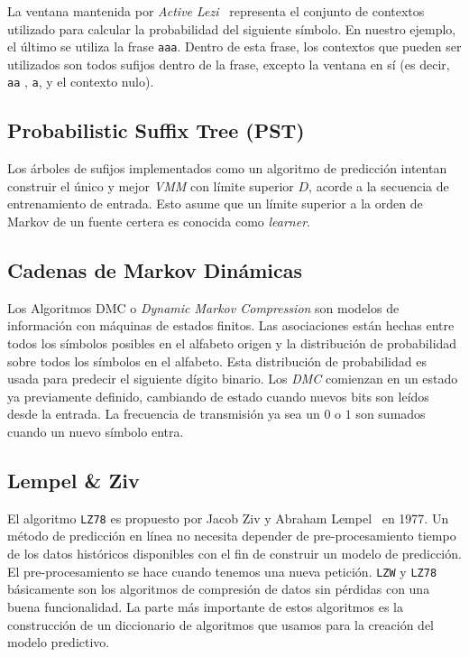 La ventana mantenida por \emph{Active Lezi}~\cite{Gopalratnam2007} representa el conjunto de contextos utilizado para calcular la probabilidad  del siguiente símbolo. En nuestro ejemplo, el último se utiliza la frase \texttt{aaa}. Dentro de esta frase, los contextos que pueden ser utilizados son todos sufijos dentro de la frase, excepto la ventana en sí (es decir, \texttt{aa} , \texttt{a}, y el contexto nulo).

	


 \subsection{Probabilistic Suffix Tree (PST)}
 
 Los árboles de sufijos implementados como un algoritmo de predicción intentan construir el único y mejor \emph{VMM} con límite superior $D$, acorde a la secuencia de entrenamiento de entrada. Esto asume que un límite superior a la orden de Markov de un fuente certera es conocida como \emph{learner}.
 
 
 
 \subsection{Cadenas de Markov Dinámicas}
 
 
 Los Algoritmos DMC o \emph{Dynamic Markov Compression} son modelos de información con máquinas de estados finitos. Las asociaciones están hechas entre todos los símbolos posibles en el alfabeto origen y la distribución de probabilidad sobre todos los símbolos en el alfabeto. 
 Esta distribución de probabilidad es usada para predecir el siguiente dígito binario. 
 Los \emph{DMC} comienzan en un estado ya previamente definido, cambiando de estado cuando nuevos bits son leídos desde la entrada. La frecuencia de transmisión ya sea un $0$ o $1$ son sumados cuando un nuevo símbolo entra. %
 
 
\subsection{Lempel \& Ziv }


El algoritmo \texttt{LZ78} es propuesto por Jacob Ziv y Abraham Lempel~\cite{ZivLempel1977} en 1977. Un método de predicción en línea no necesita depender de pre-procesamiento tiempo de los datos históricos disponibles con el fin de construir un modelo de predicción. El pre-procesamiento se hace cuando tenemos una nueva petición. \texttt{LZW} y \texttt{LZ78} básicamente son los algoritmos de compresión de datos sin pérdidas con una buena funcionalidad. La parte más importante de estos algoritmos es la construcción de un diccionario de algoritmos que usamos para la creación del modelo predictivo. 



